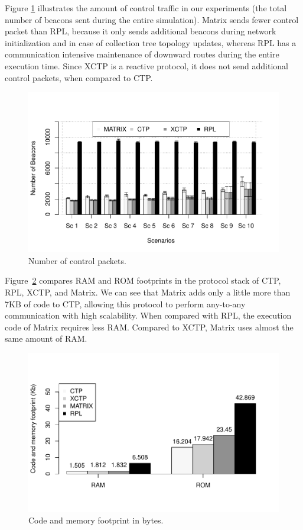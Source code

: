 Figure \ref{fig:beacons} illustrates the amount of control traffic
in our experiments (the total number of beacons sent during the entire simulation). Matrix sends fewer control packet than RPL, because it only sends additional beacons during network initialization and in case of collection tree topology updates, whereas RPL has a communication intensive maintenance of downward routes during the entire execution time. Since XCTP is a reactive protocol, it does not send additional control packets, when compared to CTP.

\begin{figure}[h]
    \centering
    \includegraphics[width=1\linewidth]{Images/beacons.pdf}
    \caption{Number of control packets.}
    \label{fig:beacons}
\end{figure}

Figure~\ref{fig:footprint} compares RAM and ROM footprints in the protocol stack of CTP, RPL, XCTP, and Matrix. We can see that Matrix adds only a little more than 7KB of code to CTP, allowing this protocol to perform any-to-any communication with high scalability. When compared with RPL, the execution code of Matrix requires less RAM. Compared to XCTP, Matrix uses almost the same amount of RAM.

\begin{figure}[h]
    \centering
    \includegraphics[width=1\linewidth]{Images/footprint.pdf}
    \caption{Code and memory footprint in bytes.}
    \label{fig:footprint}
\end{figure}

